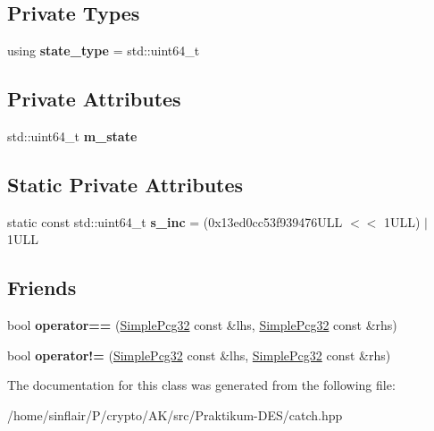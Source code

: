 \subsection*{Private Types}
\begin{DoxyCompactItemize}
\item 
\mbox{\label{classCatch_1_1SimplePcg32_a87e58661dd1fa2994b6b9c38c4efafdb}} 
using {\bfseries state\+\_\+type} = std\+::uint64\+\_\+t
\end{DoxyCompactItemize}
\subsection*{Private Attributes}
\begin{DoxyCompactItemize}
\item 
\mbox{\label{classCatch_1_1SimplePcg32_a830bb20e51776b605910f4a00dde46ad}} 
std\+::uint64\+\_\+t {\bfseries m\+\_\+state}
\end{DoxyCompactItemize}
\subsection*{Static Private Attributes}
\begin{DoxyCompactItemize}
\item 
\mbox{\label{classCatch_1_1SimplePcg32_a34f89a8ee054db204c8cf17632ac4c03}} 
static const std\+::uint64\+\_\+t {\bfseries s\+\_\+inc} = (0x13ed0cc53f939476\+U\+L\+L $<$$<$ 1\+U\+L\+L) $\vert$ 1\+U\+LL
\end{DoxyCompactItemize}
\subsection*{Friends}
\begin{DoxyCompactItemize}
\item 
\mbox{\label{classCatch_1_1SimplePcg32_a3f1e143181b91f902ce034e2878f87eb}} 
bool {\bfseries operator==} (\hyperlink{classCatch_1_1SimplePcg32}{Simple\+Pcg32} const \&lhs, \hyperlink{classCatch_1_1SimplePcg32}{Simple\+Pcg32} const \&rhs)
\item 
\mbox{\label{classCatch_1_1SimplePcg32_a4940863fe85f6c5a2fa9b3910bfb7406}} 
bool {\bfseries operator!=} (\hyperlink{classCatch_1_1SimplePcg32}{Simple\+Pcg32} const \&lhs, \hyperlink{classCatch_1_1SimplePcg32}{Simple\+Pcg32} const \&rhs)
\end{DoxyCompactItemize}


The documentation for this class was generated from the following file\+:\begin{DoxyCompactItemize}
\item 
/home/sinflair/\+P/crypto/\+A\+K/src/\+Praktikum-\/\+D\+E\+S/catch.\+hpp\end{DoxyCompactItemize}

